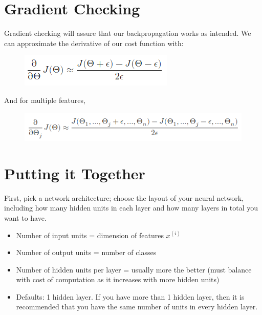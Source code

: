 \documentclass[12pt]{report}
\begin{document}
  \section{Gradient Checking}
    Gradient checking will assure that our backpropagation works as intended. We can approximate the derivative of our cost function with:

    \begin{figure}[h]
      \includegraphics[scale=0.65]{gc.png}
    \end{figure}

    And for multiple features,

    \begin{figure}[h]
      \includegraphics[scale=0.65]{gcmult.png}
    \end{figure}

  \section{Putting it Together}
    First, pick a network architecture; choose the layout of your neural network, including how many hidden units in each layer and how many layers in total you want to have.

    \begin{itemize}
      \item Number of input units = dimension of features $x^{(i)}$
      \item Number of output units = number of classes
      \item Number of hidden units per layer = usually more the better (must balance with cost of computation as it increases with more hidden units)
      \item Defaults: 1 hidden layer. If you have more than 1 hidden layer, then it is recommended that you have the same number of units in every hidden layer.
    \end{itemize}
\end{document}
